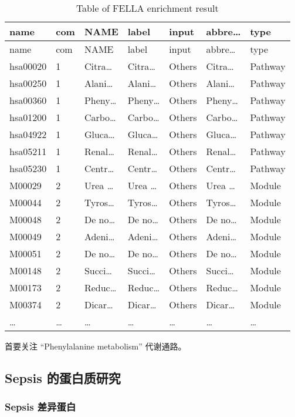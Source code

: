 \documentclass[
]{article}
\begin{document}
\begin{longtable}[]{@{}lllllll@{}}
\caption{\label{tab:table-of-FELLA-enrichment-result}Table of FELLA enrichment result}\tabularnewline
\toprule
name & com & NAME & label & input & abbre\ldots{} & type\tabularnewline
\midrule
\endfirsthead
\toprule
name & com & NAME & label & input & abbre\ldots{} & type\tabularnewline
\midrule
\endhead
hsa00020 & 1 & Citra\ldots{} & Citra\ldots{} & Others & Citra\ldots{} & Pathway\tabularnewline
hsa00250 & 1 & Alani\ldots{} & Alani\ldots{} & Others & Alani\ldots{} & Pathway\tabularnewline
hsa00360 & 1 & Pheny\ldots{} & Pheny\ldots{} & Others & Pheny\ldots{} & Pathway\tabularnewline
hsa01200 & 1 & Carbo\ldots{} & Carbo\ldots{} & Others & Carbo\ldots{} & Pathway\tabularnewline
hsa04922 & 1 & Gluca\ldots{} & Gluca\ldots{} & Others & Gluca\ldots{} & Pathway\tabularnewline
hsa05211 & 1 & Renal\ldots{} & Renal\ldots{} & Others & Renal\ldots{} & Pathway\tabularnewline
hsa05230 & 1 & Centr\ldots{} & Centr\ldots{} & Others & Centr\ldots{} & Pathway\tabularnewline
M00029 & 2 & Urea \ldots{} & Urea \ldots{} & Others & Urea \ldots{} & Module\tabularnewline
M00044 & 2 & Tyros\ldots{} & Tyros\ldots{} & Others & Tyros\ldots{} & Module\tabularnewline
M00048 & 2 & De no\ldots{} & De no\ldots{} & Others & De no\ldots{} & Module\tabularnewline
M00049 & 2 & Adeni\ldots{} & Adeni\ldots{} & Others & Adeni\ldots{} & Module\tabularnewline
M00051 & 2 & De no\ldots{} & De no\ldots{} & Others & De no\ldots{} & Module\tabularnewline
M00148 & 2 & Succi\ldots{} & Succi\ldots{} & Others & Succi\ldots{} & Module\tabularnewline
M00173 & 2 & Reduc\ldots{} & Reduc\ldots{} & Others & Reduc\ldots{} & Module\tabularnewline
M00374 & 2 & Dicar\ldots{} & Dicar\ldots{} & Others & Dicar\ldots{} & Module\tabularnewline
\ldots{} & \ldots{} & \ldots{} & \ldots{} & \ldots{} & \ldots{} & \ldots{}\tabularnewline
\bottomrule
\end{longtable}

首要关注 ``Phenylalanine metabolism'' 代谢通路。

\hypertarget{sepsis-ux7684ux86cbux767dux8d28ux7814ux7a76}{%
\subsection{Sepsis 的蛋白质研究}\label{sepsis-ux7684ux86cbux767dux8d28ux7814ux7a76}}

\hypertarget{sepsis-ux5deeux5f02ux86cbux767d}{%
\subsubsection{Sepsis 差异蛋白}\label{sepsis-ux5deeux5f02ux86cbux767d}}
\end{document}
